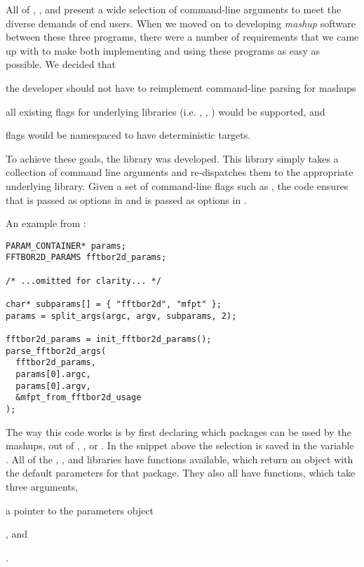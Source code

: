 \documentclass[11pt]{article}
\begin{document}

All of \fft, \rnamfpt, and \rnaeq present a wide selection of command-line arguments to meet the diverse demands of end users. When we moved on to developing {\em mashup} software between these three programs, there were a number of requirements that we came up with to make both implementing and using these programs as easy as possible. We decided that
\begin{inparaenum}
	\item the developer should not have to reimplement command-line parsing for mashups
	\item all existing flags for underlying libraries (i.e. \fft, \rnamfpt, \rnaeq) would be supported, and
	\item flags would be namespaced to have deterministic targets.
\end{inparaenum}

To achieve these goals, the library \multiParam was developed. This library simply takes a collection of command line arguments and re-dispatches them to the appropriate underlying library. Given a set of command-line flags such as , the code ensures that \fft is passed  as options in  and \rnamfpt is passed  as options in .


An example from :
\begin{verbatim}
PARAM_CONTAINER* params;
FFTBOR2D_PARAMS fftbor2d_params;

/* ...omitted for clarity... */

char* subparams[] = { "fftbor2d", "mfpt" };
params = split_args(argc, argv, subparams, 2);

fftbor2d_params = init_fftbor2d_params();
parse_fftbor2d_args(
  fftbor2d_params,
  params[0].argc,
  params[0].argv,
  &mfpt_from_fftbor2d_usage
);
\end{verbatim}

The way this code works is by first declaring which packages can be used by the mashups, out of , , or . In the snippet above the selection is saved in the variable . All of the \fft, \rnamfpt, and \rnaeq libraries have  functions available, which return an object with the default parameters for that package. They also all have  functions, which take three arguments,
\begin{inparaenum}
	[\itshape 1\upshape)]
	\item a pointer to the parameters object
	\item {}, and
	\item {}
\end{inparaenum}
.
\end{document}
